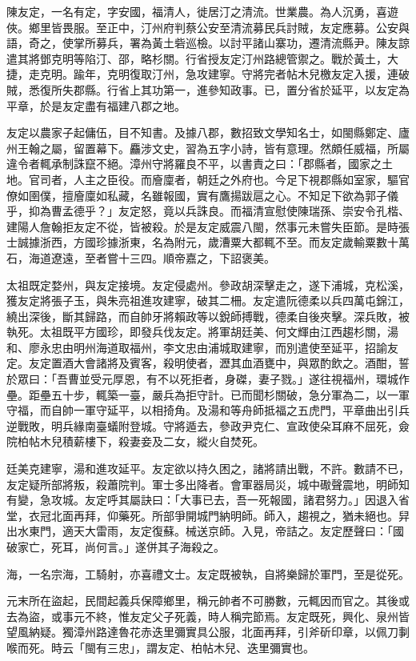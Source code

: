 陳友定，一名有定，字安國，福清人，徙居汀之清流。世業農。為人沉勇，喜遊俠。鄉里皆畏服。至正中，汀州府判蔡公安至清流募民兵討賊，友定應募。公安與語，奇之，使掌所募兵，署為黃土砦巡檢。以討平諸山寨功，遷清流縣尹。陳友諒遣其將鄧克明等陷汀、邵，略杉關。行省授友定汀州路總管禦之。戰於黃土，大捷，走克明。踰年，克明復取汀州，急攻建寧。守將完者帖木兒檄友定入援，連破賊，悉復所失郡縣。行省上其功第一，進參知政事。已，置分省於延平，以友定為平章，於是友定盡有福建八郡之地。

友定以農家子起傭伍，目不知書。及據八郡，數招致文學知名士，如閩縣鄭定、廬州王翰之屬，留置幕下。麤涉文史，習為五字小詩，皆有意理。然頗任威福，所屬違令者輒承制誅竄不絕。漳州守將羅良不平，以書責之曰：「郡縣者，國家之土地。官司者，人主之臣役。而廥廩者，朝廷之外府也。今足下視郡縣如室家，驅官僚如圉僕，擅廥廩如私藏，名雖報國，實有鷹揚跋扈之心。不知足下欲為郭子儀乎，抑為曹孟德乎？」友定怒，竟以兵誅良。而福清宣慰使陳瑞孫、崇安令孔楷、建陽人詹翰拒友定不從，皆被殺。於是友定威震八閩，然事元未嘗失臣節。是時張士誠據浙西，方國珍據浙東，名為附元，歲漕粟大都輒不至。而友定歲輸粟數十萬石，海道遼遠，至者嘗十三四。順帝嘉之，下詔褒美。

太祖既定婺州，與友定接境。友定侵處州。參政胡深擊走之，遂下浦城，克松溪，獲友定將張子玉，與朱亮祖進攻建寧，破其二柵。友定遣阮德柔以兵四萬屯錦江，繞出深後，斷其歸路，而自帥牙將賴政等以銳師搏戰，德柔自後夾擊。深兵敗，被執死。太祖既平方國珍，即發兵伐友定。將軍胡廷美、何文輝由江西趨杉關，湯和、廖永忠由明州海道取福州，李文忠由浦城取建寧，而別遣使至延平，招諭友定。友定置酒大會諸將及賓客，殺明使者，瀝其血酒甕中，與眾酌飲之。酒酣，誓於眾曰：「吾曹並受元厚恩，有不以死拒者，身磔，妻子戮。」遂往視福州，環城作壘。距壘五十步，輒築一臺，嚴兵為拒守計。已而聞杉關破，急分軍為二，以一軍守福，而自帥一軍守延平，以相掎角。及湯和等舟師抵福之五虎門，平章曲出引兵逆戰敗，明兵緣南臺蟻附登城。守將遁去，參政尹克仁、宣政使朵耳麻不屈死，僉院柏帖木兒積薪樓下，殺妻妾及二女，縱火自焚死。

廷美克建寧，湯和進攻延平。友定欲以持久困之，諸將請出戰，不許。數請不已，友定疑所部將叛，殺蕭院判。軍士多出降者。會軍器局災，城中礮聲震地，明師知有變，急攻城。友定呼其屬訣曰：「大事已去，吾一死報國，諸君努力。」因退入省堂，衣冠北面再拜，仰藥死。所部爭開城門納明師。師入，趨視之，猶未絕也。舁出水東門，適天大雷雨，友定復蘇。械送京師。入見，帝詰之。友定歷聲曰：「國破家亡，死耳，尚何言。」遂併其子海殺之。

海，一名宗海，工騎射，亦喜禮文士。友定既被執，自將樂歸於軍門，至是從死。

元末所在盜起，民間起義兵保障鄉里，稱元帥者不可勝數，元輒因而官之。其後或去為盜，或事元不終，惟友定父子死義，時人稱完節焉。友定既死，興化、泉州皆望風納疑。獨漳州路達魯花赤迭里彌實具公服，北面再拜，引斧斫印章，以佩刀剚喉而死。時云「閩有三忠」，謂友定、柏帖木兒、迭里彌實也。


